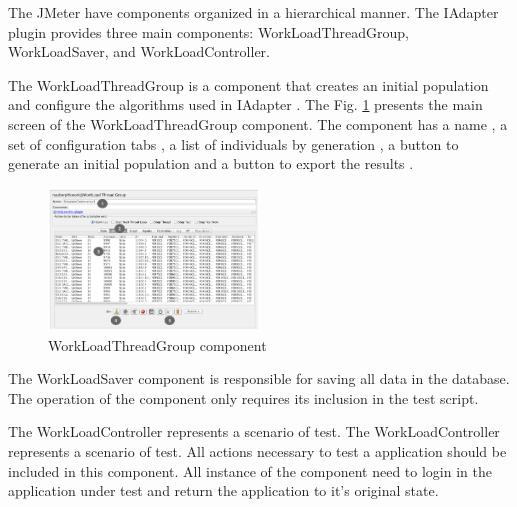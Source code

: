 The JMeter have components organized  in a hierarchical manner. The IAdapter plugin provides three main components: WorkLoadThreadGroup, WorkLoadSaver, and WorkLoadController.
 
The WorkLoadThreadGroup is a component that creates an initial population and configure the algorithms used in IAdapter . The Fig. \ref{fig:tela1iadapter} presents the main screen of the WorkLoadThreadGroup component. The component has a name , a set of configuration tabs , a list of individuals by generation , a button to generate an initial population  and a button to export the results .

\begin{figure}[h]
\includegraphics[width=0.5\textwidth]{./images/tela1iadapter.png}
\caption{WorkLoadThreadGroup component}
\label{fig:tela1iadapter}
\end{figure}

The WorkLoadSaver component is responsible for saving all data in the database. The operation of the component only requires its inclusion in the test script.

The WorkLoadController represents a scenario of test. The WorkLoadController represents a scenario of test. All actions necessary to test a application should be included in this component. All instance of the component need to login in the application under test and return the application to it's original state.